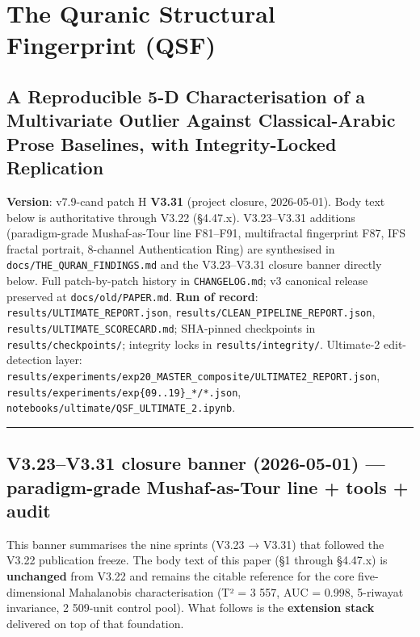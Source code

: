 \documentclass[
]{article}
\author{}
\date{}
\begin{document}
\section{The Quranic Structural Fingerprint
(QSF)}\label{the-quranic-structural-fingerprint-qsf}

\subsection{A Reproducible 5-D Characterisation of a Multivariate
Outlier Against Classical-Arabic Prose Baselines, with Integrity-Locked
Replication}\label{a-reproducible-5-d-characterisation-of-a-multivariate-outlier-in-classical-arabic-prose-with-integrity-locked-replication}

\textbf{Version}: v7.9-cand patch H \textbf{V3.31} (project closure,
2026-05-01). Body text below is authoritative through V3.22 (§4.47.x).
V3.23--V3.31 additions (paradigm-grade Mushaf-as-Tour line F81--F91,
multifractal fingerprint F87, IFS fractal portrait, 8-channel
Authentication Ring) are synthesised in
\texttt{docs/THE\_QURAN\_FINDINGS.md} and the V3.23--V3.31 closure
banner directly below. Full patch-by-patch history in
\texttt{CHANGELOG.md}; v3 canonical release preserved at
\texttt{docs/old/PAPER.md}. \textbf{Run of record}:
\texttt{results/ULTIMATE\_REPORT.json},
\texttt{results/CLEAN\_PIPELINE\_REPORT.json},
\texttt{results/ULTIMATE\_SCORECARD.md}; SHA-pinned checkpoints in
\texttt{results/checkpoints/}; integrity locks in
\texttt{results/integrity/}. Ultimate-2 edit-detection layer:
\texttt{results/experiments/exp20\_MASTER\_composite/ULTIMATE2\_REPORT.json},
\texttt{results/experiments/exp\{09..19\}\_*/*.json},
\texttt{notebooks/ultimate/QSF\_ULTIMATE\_2.ipynb}.

\begin{center}\rule{0.5\linewidth}{0.5pt}\end{center}

\subsection{V3.23--V3.31 closure banner (2026-05-01) --- paradigm-grade
Mushaf-as-Tour line + tools +
audit}\label{v3.23v3.31-closure-banner-2026-05-01-paradigm-grade-mushaf-as-tour-line-tools-audit}

This banner summarises the nine sprints (V3.23 → V3.31) that followed
the V3.22 publication freeze. The body text of this paper (§1 through
§4.47.x) is \textbf{unchanged} from V3.22 and remains the citable
reference for the core five-dimensional Mahalanobis characterisation (T²
= 3 557, AUC = 0.998, 5-riwayat invariance, 2 509-unit control pool).
What follows is the \textbf{extension stack} delivered on top of that
foundation.
\end{document}
